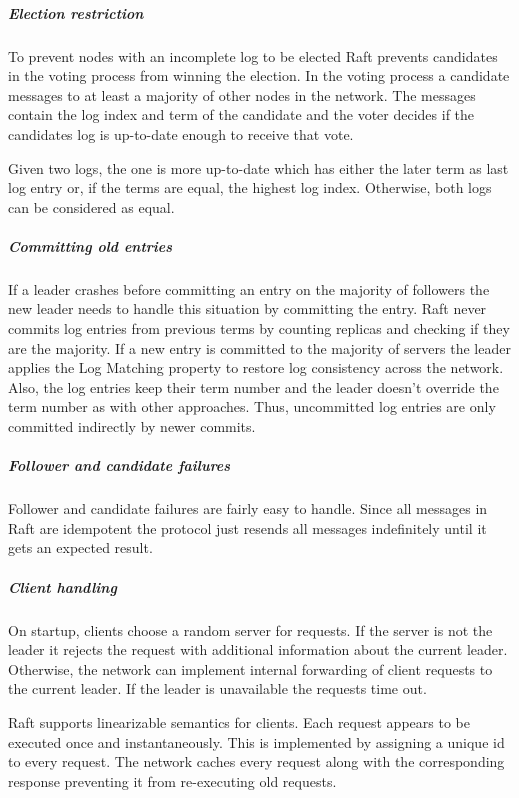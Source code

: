 \subparagraph{Election restriction}
To prevent nodes with an incomplete log to be elected
Raft prevents candidates in the voting process from winning
the election. In the voting process a candidate messages
to at least a majority of other nodes in the network.
The messages contain the log index and term of the candidate
and the voter decides if the candidates log is up-to-date
enough to receive that vote.~\cite{ongaro2014search}

\begin{defi}
  Given two logs, the one is more up-to-date which has
  either the later term as last log entry or, if the terms
  are equal, the highest log index. Otherwise, both logs
  can be considered as equal.
\end{defi}

\subparagraph{Committing old entries}
If a leader crashes before committing an entry on the
majority of followers the new leader needs to handle
this situation by committing the entry. Raft never commits
log entries from previous terms by counting replicas and
checking if they are the majority. If a new entry is committed
to the majority of servers the leader applies the Log Matching
property to restore log consistency across the network.
Also, the log entries keep their term number and the
leader doesn't override the term number as with other
approaches. Thus, uncommitted log entries are only
committed indirectly by newer commits.~\cite{ongaro2014search}

\subparagraph{Follower and candidate failures}
Follower and candidate failures are fairly easy to handle.
Since all messages in Raft are idempotent the protocol
just resends all messages indefinitely until it gets
an expected result.~\cite{ongaro2014search}

\subparagraph{Client handling}
On startup, clients choose a random server for
requests. If the server is not the leader it rejects
the request with additional information about the current leader.
Otherwise, the network can implement internal forwarding of client
requests to the current leader. If the leader is unavailable the
requests time out.~\cite{ongaro2014consensus}

Raft supports linearizable semantics for clients. Each request
appears to be executed once and instantaneously. This is implemented
by assigning a unique id to every request. The network
caches every request along with the corresponding response preventing
it from re-executing old requests.~\cite{ongaro2014consensus}

